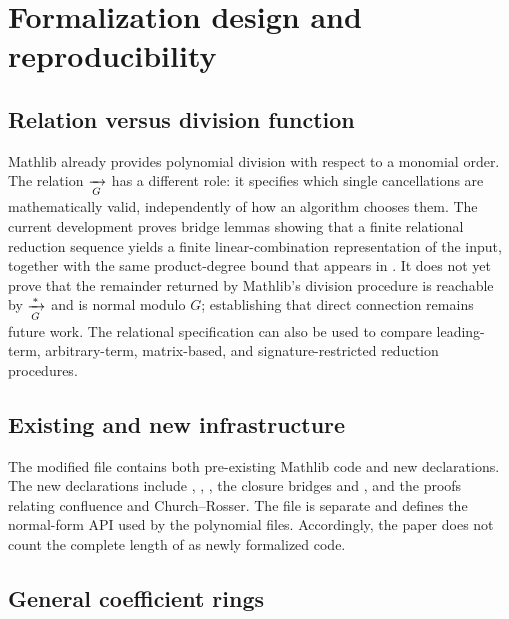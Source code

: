 \section{Formalization design and reproducibility}\label{sec:design}

\subsection{Relation versus division function}

Mathlib already provides polynomial division with respect to a monomial
order.  The relation $\xrightarrow[G]{}$ has a different role: it specifies which
single cancellations are mathematically valid, independently of how an
algorithm chooses them.  The current development proves bridge lemmas showing
that a finite relational reduction sequence yields a finite linear-combination
representation of the input, together with the same product-degree bound that
appears in .  It does not yet prove that the remainder
returned by Mathlib's division procedure is reachable by $\xrightarrow[G]{*}$ and is
normal modulo $G$; establishing that direct connection remains future work.
The relational specification can also be used to compare leading-term,
arbitrary-term, matrix-based, and signature-restricted reduction procedures.

\subsection{Existing and new infrastructure}

The modified  file contains both pre-existing Mathlib
code and new declarations.  The new declarations include ,
, , the closure bridges
 and , and
the proofs relating confluence and Church--Rosser.  The file  is separate and defines the
normal-form API used by the polynomial files.  Accordingly, the paper does not
count the complete length of  as newly formalized code.

\subsection{General coefficient rings}

